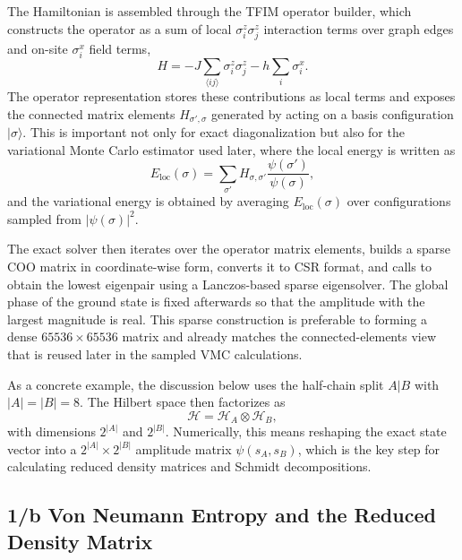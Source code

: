 \documentclass[11pt,a4paper]{article}
\begin{document}
    The Hamiltonian is assembled through the TFIM operator builder, which constructs the operator as a sum of local $\sigma_i^z \sigma_j^z$ interaction terms over graph edges and on-site $\sigma_i^x$ field terms,
    \begin{equation}
        H = -J \sum_{\langle ij \rangle} \sigma_i^z \sigma_j^z - h \sum_i \sigma_i^x .
    \end{equation}
    The operator representation stores these contributions as local terms and exposes the connected matrix elements $H_{\sigma',\sigma}$ generated by acting on a basis configuration $\lvert \sigma \rangle$. This is important not only for exact diagonalization but also for the variational Monte Carlo estimator used later, where the local energy is written as
    \begin{equation}
        E_{\mathrm{loc}}(\sigma) = \sum_{\sigma'} H_{\sigma,\sigma'} \frac{\psi(\sigma')}{\psi(\sigma)} ,
    \end{equation}
    and the variational energy is obtained by averaging $E_{\mathrm{loc}}(\sigma)$ over configurations sampled from $\lvert \psi(\sigma) \rvert^2$.

    The exact solver then iterates over the operator matrix elements, builds a sparse COO matrix in coordinate-wise form, converts it to CSR format, and calls  to obtain the lowest eigenpair using a Lanczos-based sparse eigensolver. The global phase of the ground state is fixed afterwards so that the amplitude with the largest magnitude is real. This sparse construction is preferable to forming a dense $65536 \times 65536$ matrix and already matches the connected-elements view that is reused later in the sampled VMC calculations.

    As a concrete example, the discussion below uses the half-chain split $A|B$ with $\lvert A \rvert = \lvert B \rvert = 8$. The Hilbert space then factorizes as
    \begin{equation}
        \mathcal{H} = \mathcal{H}_A \otimes \mathcal{H}_B ,
    \end{equation}
    with dimensions $2^{\lvert A \rvert}$ and $2^{\lvert B \rvert}$. Numerically, this means reshaping the exact state vector into a $2^{\lvert A \rvert} \times 2^{\lvert B \rvert}$ amplitude matrix $\psi(s_A,s_B)$, which is the key step for calculating reduced density matrices and Schmidt decompositions.

    \subsection*{1/b Von Neumann Entropy and the Reduced Density Matrix}
\end{document}
